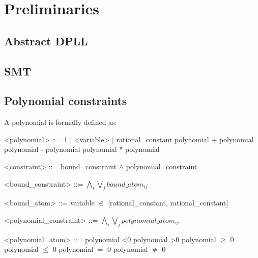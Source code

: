 \chapter{Preliminaries}
\section{Abstract DPLL}
\section{SMT}
\section{Polynomial constraints}
A polynomial is formally defined as:
\begin{center}
\begin{grammar}
<polynomial> ::= 1 | <variable> | rational\_constant 
				 \alt polynomial + polynomial
			     \alt polynomial - polynomial
			     \alt polynomial * polynomial

<constraint> ::= bound\_constraint $\wedge$ polynomial\_constraint

<bound\_constraint> ::= $\bigwedge\limits_{i} \bigvee\limits_{j} bound\_atom_{ij}$

<bound\_atom> ::= variable $\in$ [rational\_constant, rational\_constant]

<polynomial\_constraint> ::= $\bigwedge\limits_{i} \bigvee\limits_{j} polynomial\_atom_{ij}$

<polynomial\_atom> ::= polynomial \textless 0
					\alt polynomial \textgreater 0
					\alt polynomial $\ge$ 0
					\alt polynomial $\le$ 0
					\alt polynomial $=$ 0
					\alt polynomial $\ne$ 0
\end{grammar}
\end{center}